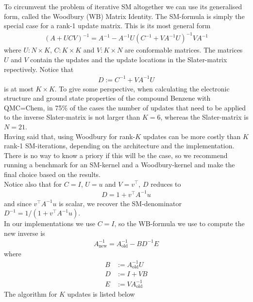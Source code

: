 \documentclass[11pt]{article}
\numberwithin{figure}{section}
\numberwithin{table}{section}
\begin{document}
      To circumvent the problem of iterative SM altogether we can use its generalised form, called the Woodbury (WB) Matrix Identity. The SM-formula is simply the special case for a rank-1 update matrix. This is its most general form
      \begin{align}
        \left(A+UCV\right)^{-1} = A^{-1} - A^{-1}U(C^{-1}+VA^{-1}U)^{-1}VA^{-1}
      \end{align}
      where $U:N\times K$, $C:K\times K$ and $V:K\times N$ are conformable matrices. The matrices $U$ and $V$ contain the updates and the update locations in the Slater-matrix repectively. Notice that
      \begin{align}\label{eqn:wb-denom}
        D:=C^{-1}+VA^{-1}U
      \end{align}  is at most $K\times K$. To give some perspective, when calculating the electronic structure and ground state properties of the compound Benzene with QMC=Chem, in 75\% of the cases the number of updates that need to be applied to the inverse Slater-matrix is not larger than $K=6$, whereas the Slater-matrix is $N=21$.\\
      
      Having said that, using Woodbury for rank-$K$ updates can be more costly than $K$ rank-1 SM-iterations, depending on the architecture and the implementation. There is no way to know a priory if this will be the case, so we recommend running a benchmark for an SM-kernel and a Woodbury-kernel and make the final choice based on the results.\\
      
      Notice also that for $C=I$, $U=u$ and $V=v^\top$, $D$ reduces to
      \begin{align}
        D = 1 + v^\top A^{-1} u
      \end{align}
      and since $v^\top A^{-1} u$ is scalar, we recover the SM-denominator $D^{-1}=1/\left(1 + v^\top A^{-1} u\right)$.\\
      
      In our implementations we use $C=I$, so the WB-formula we use to compute the new inverse is
      \begin{align}
        A_{\text{new}}^{-1}=A_{\text{old}}^{-1}-BD^{-1}E
      \end{align}
      where 
      \begin{align}
        B&:=A_{\text{old}}^{-1}U \\
        D&:=I+VB \\
        E&:=VA_{\text{old}}^{-1}
      \end{align}
      The algorithm for $K$ updates is listed below\\
      
\end{document}
